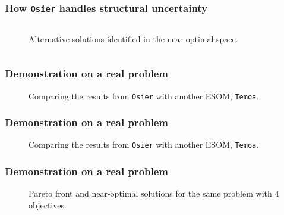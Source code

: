 \begin{frame}
    \frametitle{How \texttt{Osier} handles structural uncertainty}

    \begin{columns}
        \column[t]{4cm}

        \column[t]{6cm}
        \begin{figure}
            \centering
            \resizebox{\columnwidth}{!}{}
            \caption{Alternative solutions identified in the near optimal space.}
            \label{fig:nd-alt-points}
        \end{figure}
    \end{columns}

\end{frame}

\begin{frame}
    \frametitle{Demonstration on a real problem}

    \begin{figure}
        \centering 
        \resizebox{0.75\columnwidth}{!}{}
        \caption{Comparing the results from \texttt{Osier} with another ESOM, \texttt{Temoa}.}
        \label{fig:osier-temoa-benchmark-1}
    \end{figure}

\end{frame}


\begin{frame}
    \frametitle{Demonstration on a real problem}

    \begin{figure}
        \centering 
        \resizebox{0.75\columnwidth}{!}{}
        \caption{Comparing the results from \texttt{Osier} with another ESOM, \texttt{Temoa}.}
        \label{fig:osier-temoa-benchmark-2}
    \end{figure}

\end{frame}

\begin{frame}
    \frametitle{Demonstration on a real problem}

    \begin{figure}
        \centering 
        \resizebox{0.9\columnwidth}{!}{}
        \caption{Pareto front and near-optimal solutions for the same problem with 4 objectives.}
        \label{fig:4-obj-objective-space}
    \end{figure}

\end{frame}

